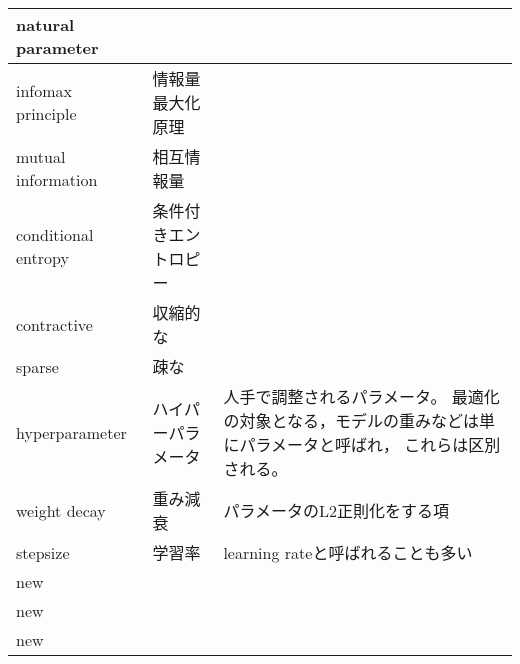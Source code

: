 \documentclass[dvipdfmx, fleqn]{jsarticle}
\begin{document}
\begin{longtable}{lp{4cm}p{7cm}}
        natural parameter
            & 
            & 
            \tabularnewline \hline
        infomax principle
            & 情報量最大化原理
            & 
            \tabularnewline \hline
        mutual information
            & 相互情報量
            & 
            \tabularnewline \hline
        conditional entropy
            & 条件付きエントロピー
            & 
            \tabularnewline \hline
        contractive
            & 収縮的な
            & 
            \tabularnewline \hline
        sparse
            & 疎な
            & 
            \tabularnewline \hline
        hyperparameter
            & ハイパーパラメータ
            & 人手で調整されるパラメータ。
            最適化の対象となる，モデルの重みなどは単にパラメータと呼ばれ，
            これらは区別される。
            \tabularnewline \hline
        weight decay
            & 重み減衰
            & パラメータのL2正則化をする項
            \tabularnewline \hline
        stepsize
            & 学習率
            & learning rateと呼ばれることも多い
            \tabularnewline \hline
        new
            & 
            & 
            \tabularnewline \hline
        new
            & 
            & 
            \tabularnewline \hline
        new
            & 
            & 
            \tabularnewline \hline
\end{longtable}
\end{document}
